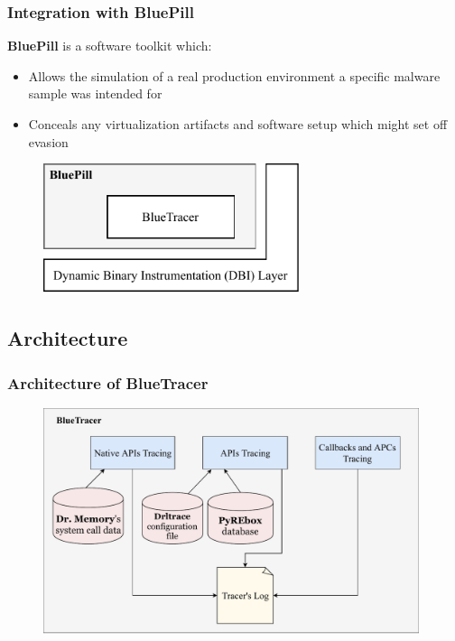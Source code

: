\documentclass[compress]{beamer}
\begin{document}
\begin{frame}
    \frametitle{Integration with BluePill}
	\textbf{BluePill} is a software toolkit which:
	\begin{itemize}
	\item Allows the simulation of a real production environment a specific malware
sample was intended for
	\item Conceals any virtualization artifacts and software setup which might set off
evasion
	\end{itemize}
	\medskip
	
	    \begin{figure}
    	\vspace{-0.3cm}
        \includegraphics[width=7.5cm]{image/BluePill.pdf}
    \end{figure}

\end{frame}
\fi

\subsection{Architecture}

\begin{frame}
    \frametitle{Architecture of BlueTracer}
    
    \begin{figure}
    	\vspace{-0.5cm}
        \includegraphics[width=11cm]{image/BlueTracer.pdf}
    \end{figure}
    
	

\end{frame}
\end{document}
